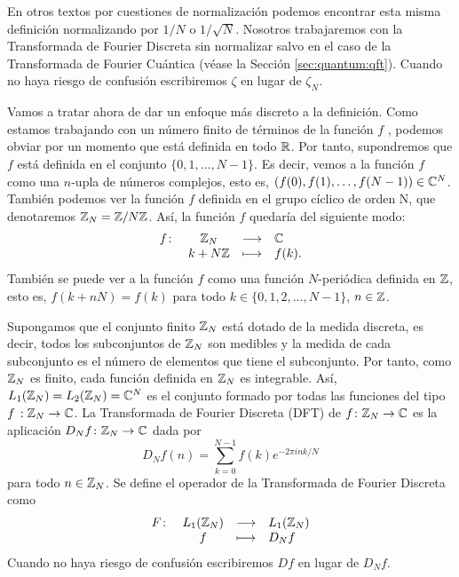\documentclass{article}
\begin{document}
En otros textos por cuestiones de normalización podemos encontrar esta misma definición normalizando por $1/N$ o $1/ \sqrt{N}$. Nosotros trabajaremos con la Transformada de Fourier Discreta sin normalizar salvo en el caso de la Transformada de Fourier Cuántica (véase la Sección \ref{sec:quantum:qft}). Cuando no haya riesgo de confusión escribiremos $\zeta$ en lugar de $\zeta_N$.

Vamos a tratar ahora de dar un enfoque más discreto a la definición. Como estamos trabajando con un número finito de términos de la función $f$ , podemos obviar por un momento que está definida en todo $\mathbb{R}$. Por tanto, supondremos que $f$ está definida en el conjunto $\{ 0,1,\dots ,N-1 \}$. Es decir, vemos a la función $f$ como una $n$-upla de números complejos, esto es, $(f(0),f(1),\dots ,f(N-1)) \in \mathbb{C} ^N$. También podemos ver la función $f$ definida en el grupo cíclico de orden N, que denotaremos $\mathbb{Z} _N = \mathbb{Z} / N \mathbb{Z} $.
Así, la función $f$ quedaría del siguiente modo:
\[
    \begin{array}{rccl}
        f \colon & \mathbb{Z} _N & \longrightarrow & \mathbb{C} \\
        & k+N\mathbb{Z} & \longmapsto & f(k).
    \end{array}
\]
También se puede ver a la función $f$ como una función $N$-periódica definida en $\mathbb{Z}$, esto es, $f(k+nN) = f(k)$ para todo $k \in \{0,1,2, \dots ,N-1\}$, $n \in \mathbb{Z}$.
\begin{definition}
    Supongamos que el conjunto finito $\mathbb{Z} _N$ está dotado de la medida discreta, es decir, todos los subconjuntos de $\mathbb{Z} _N$ son medibles y la medida de cada subconjunto es el número de elementos que tiene el subconjunto. Por tanto, como $\mathbb{Z} _N$ es finito, cada función definida en $\mathbb{Z}_N$ es integrable. Así, $L_1 (\mathbb{Z} _N ) = L_2 (\mathbb{Z} _N ) = \mathbb{C} ^N$ es el conjunto formado por todas las funciones del tipo $f \, : \mathbb{Z} _N \rightarrow \mathbb{C} $. La Transformada de Fourier Discreta (DFT) de $f \colon \mathbb{Z} _N \to \mathbb{C} $ es la aplicación $D_N f \colon \mathbb{Z}_N \to \mathbb{C}$ dada por
    \begin{equation}
        D_N f(n) = \sum_{k=0}^{N-1}f(k)e^{-2\pi ink/N}
        \label{def:DFT}
    \end{equation}
    para todo $n \in \mathbb{Z}_N$. %
    Se define el operador de la Transformada de Fourier Discreta como
\[
    \begin{array}{rccl}
        F\colon & L_1( \mathbb{Z} _N) & \longrightarrow & L_1( \mathbb{Z} _N) \\
        & f & \longmapsto & D_N f
    \end{array}
\]
Cuando no haya riesgo de confusión escribiremos $D f$ en lugar de $D_N f$.
\end{definition}
\end{document}
